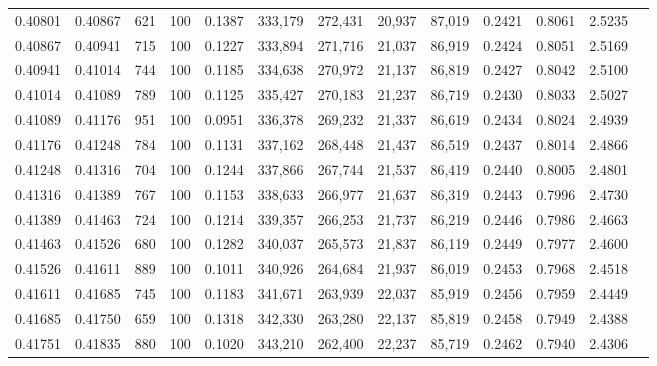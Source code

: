 \begin{tabular}{rrrrrrrrrrrrr}
0.40801 & 0.40867 &   621 & 100 &                                     0.1387 & 333,179 & 272,431 &  20,937 &  87,019 & 0.2421 & 0.8061 & 2.5235 \\
0.40867 & 0.40941 &   715 & 100 &                                     0.1227 & 333,894 & 271,716 &  21,037 &  86,919 & 0.2424 & 0.8051 & 2.5169 \\
0.40941 & 0.41014 &   744 & 100 &                                     0.1185 & 334,638 & 270,972 &  21,137 &  86,819 & 0.2427 & 0.8042 & 2.5100 \\
0.41014 & 0.41089 &   789 & 100 &                                     0.1125 & 335,427 & 270,183 &  21,237 &  86,719 & 0.2430 & 0.8033 & 2.5027 \\
0.41089 & 0.41176 &   951 & 100 &                                     0.0951 & 336,378 & 269,232 &  21,337 &  86,619 & 0.2434 & 0.8024 & 2.4939 \\
0.41176 & 0.41248 &   784 & 100 &                                     0.1131 & 337,162 & 268,448 &  21,437 &  86,519 & 0.2437 & 0.8014 & 2.4866 \\
0.41248 & 0.41316 &   704 & 100 &                                     0.1244 & 337,866 & 267,744 &  21,537 &  86,419 & 0.2440 & 0.8005 & 2.4801 \\
0.41316 & 0.41389 &   767 & 100 &                                     0.1153 & 338,633 & 266,977 &  21,637 &  86,319 & 0.2443 & 0.7996 & 2.4730 \\
0.41389 & 0.41463 &   724 & 100 &                                     0.1214 & 339,357 & 266,253 &  21,737 &  86,219 & 0.2446 & 0.7986 & 2.4663 \\
0.41463 & 0.41526 &   680 & 100 &                                     0.1282 & 340,037 & 265,573 &  21,837 &  86,119 & 0.2449 & 0.7977 & 2.4600 \\
0.41526 & 0.41611 &   889 & 100 &                                     0.1011 & 340,926 & 264,684 &  21,937 &  86,019 & 0.2453 & 0.7968 & 2.4518 \\
0.41611 & 0.41685 &   745 & 100 &                                     0.1183 & 341,671 & 263,939 &  22,037 &  85,919 & 0.2456 & 0.7959 & 2.4449 \\
0.41685 & 0.41750 &   659 & 100 &                                     0.1318 & 342,330 & 263,280 &  22,137 &  85,819 & 0.2458 & 0.7949 & 2.4388 \\
0.41751 & 0.41835 &   880 & 100 &                                     0.1020 & 343,210 & 262,400 &  22,237 &  85,719 & 0.2462 & 0.7940 & 2.4306 \\

\end{tabular}

